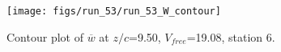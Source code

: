 \begin{figure}[H]
\centering
\texttt{[image: figs/run\_53/run\_53\_W\_contour]}
\caption{Contour plot of $\overline{w}$ at $z/c$=9.50, $V_{free}$=19.08, station 6.}
\end{figure}


